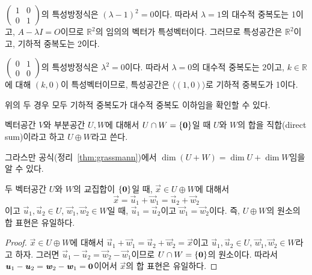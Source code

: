 \documentclass[../engineering_mathematics_lecture_note.tex]{subfiles}
\begin{document}
\begin{example}
    $\begin{pmatrix}1 & 0\\0 & 1\end{pmatrix}$의 특성방정식은 $(\lambda - 1)^2 = 0$이다.
    따라서 $\lambda = 1$의 대수적 중복도는 1이고, $A - \lambda I = O$이므로 $\mathbb R^2$의 임의의 벡터가 특성벡터이다.
    그러므로 특성공간은 $\mathbb R^2$이고, 기하적 중복도는 2이다.

    $\begin{pmatrix}0 & 1\\0 & 0\end{pmatrix}$의 특성방정식은 $\lambda^2 = 0$이다.
    따라서 $\lambda = 0$의 대수적 중복도는 2이고, $k \in \mathbb R$에 대해 $(k, 0)$이 특성벡터이므로, 특성공간은 $\langle (1, 0) \rangle$로 기하적 중복도가 1이다.

    위의 두 경우 모두 기하적 중복도가 대수적 중복도 이하임을 확인할 수 있다.
\end{example}

\begin{definition}
    벡터공간 $V$와 부분공간 $U, W$에 대해서 $U \cap W = \{\bm{\mathrm{0}}\}$일 때 $U$와 $W$의 합을 직합(direct sum)이라고 하고 $U \oplus W$라고 쓴다.
\end{definition}

\begin{remark}
    그라스만 공식(정리~\ref{thm:grassmann})에서 $\dim (U + W) = \dim U + \dim W$임을 알 수 있다.
\end{remark}

\begin{theorem}
    두 벡터공간 $U$와 $W$의 교집합이 $\{\bm{\mathrm{0}}\}$일 때, $\vec x \in U \oplus W$에 대해서
    \begin{equation*}
        \vec x = \vec u_1 + \vec w_1 = \vec u_2 + \vec w_2
    \end{equation*}
    이고 $\vec u_1, \vec u_2 \in U$, $\vec w_1, \vec w_2 \in W$일 때, $\vec u_1 = \vec u_2$이고 $\vec w_1 = \vec w_2$이다.
    즉, $U \oplus W$의 원소의 합 표현은 유일하다.
\end{theorem}

\begin{proof}
    $\vec x \in U \oplus W$에 대해서 $\vec u_1 + \vec w_1 = \vec u_2 + \vec w_2 = \vec x$이고 $\vec u_1, \vec u_2 \in U$, $\vec w_1, \vec w_2 \in W$라고 하자.
    그러면 $\vec u_1 - \vec u_2 = \vec w_2 - \vec w_1$이므로 $U \cap W = \{\bm{\mathrm{0}}\}$의 원소이다.
    따라서 $\bm{\mathit{u}}_1 - \bm{\mathit{u}}_2 = \bm{\mathit{w}}_2 - \bm{\mathit{w}}_1 = \bm{\mathrm{0}}$이어서 $\vec x$의 합 표현은 유일하다.
\end{proof}
\end{document}
